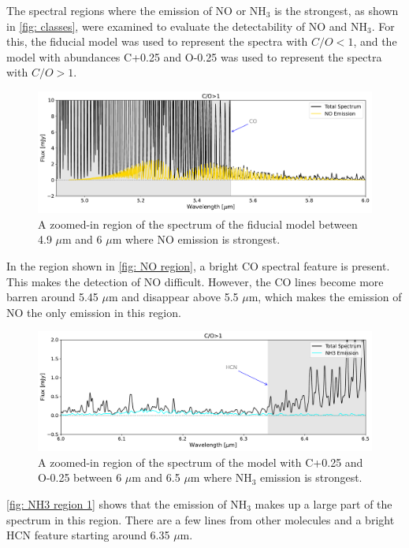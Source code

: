 \documentclass[oneside, single, authoryear, semicolon, 12pt]{lion-msc}
\newcommand{\4}{$_4$}
\newcommand{\3}{$_3$}
\newcommand{\2}{$_2$}
\begin{document}
The spectral regions where the emission of NO or NH\3 is the strongest, as shown in \autoref{fig: classes}, were examined to evaluate the detectability of NO and NH\3. For this, the fiducial model was used to represent the spectra with $C/O<1$, and the model with abundances C+0.25 and O-0.25 was used to represent the spectra with $C/O>1$.

\begin{figure}[H]
    \centering
    \includegraphics[width=\linewidth]{Figures/NO_region.pdf}
    \caption{A zoomed-in region of the spectrum of the fiducial model between 4.9 $\mu$m and 6 $\mu$m where NO emission is strongest.}
    \label{fig: NO region}
\end{figure}

In the region shown in \autoref{fig: NO region}, a bright CO spectral feature is present. This makes the detection of NO difficult. However, the CO lines become more barren around 5.45 $\mu$m and disappear above 5.5 $\mu$m, which makes the emission of NO the only emission in this region. 

\begin{figure}[H]
    \centering
    \includegraphics[width=\linewidth]{Figures/NH3_region1.pdf}
    \caption{A zoomed-in region of the spectrum of the model with C+0.25 and O-0.25 between 6 $\mu$m and 6.5 $\mu$m where NH\3 emission is strongest.}
    \label{fig: NH3 region 1}
\end{figure}

\autoref{fig: NH3 region 1} shows that the emission of NH\3 makes up a large part of the spectrum in this region. There are a few lines from other molecules and a bright HCN feature starting around 6.35 $\mu$m.
\end{document}
